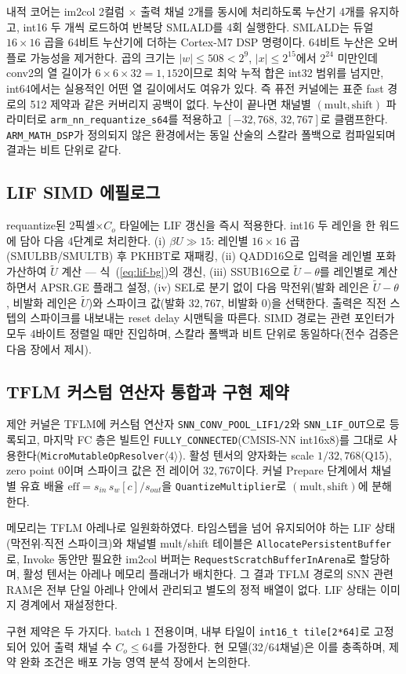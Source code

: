 내적 코어는 im2col 2컬럼 $\times$ 출력 채널 2개를 동시에 처리하도록
누산기 4개를 유지하고, int16 두 개씩 로드하여 반복당 SMLALD를 4회
실행한다. SMLALD는 듀얼 $16\times16$ 곱을 64비트
누산기에 더하는 Cortex-M7 DSP 명령이다. 64비트 누산은 오버플로 가능성을
제거한다. 곱의 크기는 $|w|\le508<2^{9}$, $|x|\le2^{15}$에서 $2^{24}$
미만인데 conv2의 열 길이가 $6\times6\times32=1{,}152$이므로 최악 누적
합은 int32 범위를 넘지만, int64에서는 실용적인 어떤 열 길이에서도
여유가 있다. 즉 퓨전 커널에는 표준 fast 경로의 512 제약과 같은 커버리지
공백이 없다. 누산이 끝나면 채널별 $(\mathrm{mult},\mathrm{shift})$
파라미터로 \texttt{arm\_nn\_requantize\_s64}를 적용하고
$[-32{,}768,\,32{,}767]$로 클램프한다. \texttt{ARM\_MATH\_DSP}가
정의되지 않은 환경에서는 동일 산술의 스칼라 폴백으로 컴파일되며 결과는
비트 단위로 같다.

\subsection{LIF SIMD 에필로그}

requantize된 2픽셀$\times C_o$ 타일에는 LIF 갱신을 즉시 적용한다.
int16 두 레인을 한 워드에 담아 다음 4단계로 처리한다. (i)
$\beta U \gg 15$: 레인별 $16\times16$ 곱(SMULBB/SMULTB) 후 PKHBT로
재패킹, (ii) QADD16으로 입력을 레인별 포화 가산하여 $\tilde U$ 계산
--- 식~(\ref{eq:lif-bg})의 갱신, (iii) SSUB16으로 $\tilde U-\theta$를
레인별로 계산하면서 APSR.GE 플래그 설정, (iv) SEL로 분기 없이 다음
막전위(발화 레인은 $\tilde U-\theta$, 비발화 레인은 $\tilde U$)와
스파이크 값(발화 $32{,}767$, 비발화 0)을 선택한다. 출력은 직전 스텝의
스파이크를 내보내는 reset delay 시맨틱을 따른다. SIMD 경로는 관련
포인터가 모두 4바이트 정렬일 때만 진입하며, 스칼라 폴백과 비트 단위로
동일하다(전수 검증은 다음 장에서 제시).

\subsection{TFLM 커스텀 연산자 통합과 구현 제약}

제안 커널은 TFLM\cite{david2021tflm}에 커스텀 연산자
\texttt{SNN\_CONV\_POOL\_LIF1/2}와 \texttt{SNN\_LIF\_OUT}으로 등록되고,
마지막 FC 층은 빌트인 \texttt{FULLY\_CONNECTED}(CMSIS-NN int16x8)를
그대로 사용한다(\texttt{MicroMutableOpResolver}$\langle4\rangle$).
활성 텐서의 양자화는 scale $1/32{,}768$(Q15), zero point 0이며 스파이크
값은 전 레이어 $32{,}767$이다. 커널 Prepare 단계에서 채널별 유효 배율
$\mathrm{eff}=s_{in}\,s_{w}[c]/s_{out}$을 \texttt{QuantizeMultiplier}로
$(\mathrm{mult},\mathrm{shift})$에 분해한다.

메모리는 TFLM 아레나로 일원화하였다. 타임스텝을 넘어 유지되어야 하는
LIF 상태(막전위$\cdot$직전 스파이크)와 채널별 mult/shift 테이블은
\texttt{AllocatePersistentBuffer}로, Invoke 동안만 필요한 im2col
버퍼는 \texttt{RequestScratchBufferInArena}로 할당하며, 활성 텐서는
아레나 메모리 플래너가 배치한다. 그 결과 TFLM 경로의 SNN 관련 RAM은
전부 단일 아레나 안에서 관리되고 별도의 정적 배열이 없다. LIF 상태는
이미지 경계에서 재설정한다.

구현 제약은 두 가지다. batch 1 전용이며, 내부 타일이
\texttt{int16\_t tile[2*64]}로 고정되어 있어 출력 채널 수
$C_o \le 64$를 가정한다. 현 모델(32/64채널)은 이를 충족하며, 제약
완화 조건은 배포 가능 영역 분석 장에서 논의한다.
